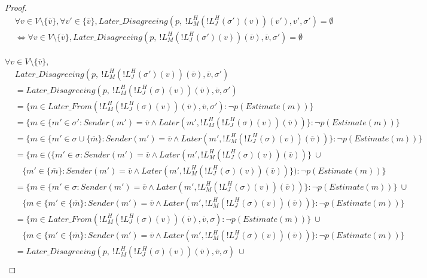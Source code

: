 \begin{proof}
\begin{align}
&\forall v \in V \setminus \{\overline{v}\}, \forall v' \in \{\overline{v}\}, Later\_Disagreeing(p,~!L^H_M(!L^H_J(\sigma')(v))(v'), v', \sigma') = \emptyset \\
&\iff \forall v \in V \setminus \{\overline{v}\}, Later\_Disagreeing(p,~!L^H_M(!L^H_J(\sigma')(v))(\overline{v}), \overline{v}, \sigma') = \emptyset \\
\end{align}

$\forall v \in V \setminus \{\overline{v}\},$
\begin{align}
&Later\_Disagreeing(p,~!L^H_M(!L^H_J(\sigma')(v))(\overline{v}), \overline{v}, \sigma') \\
&= Later\_Disagreeing(p,~!L^H_M(!L^H_J(\sigma)(v))(\overline{v}), \overline{v}, \sigma')\\
&= \{m \in Later\_From(!L^H_M(!L^H_J(\sigma)(v))(\overline{v}), \overline{v}, \sigma') : \neg p(Estimate(m)) \} \\
&= \{m \in \{m' \in \sigma' : Sender(m') = \overline{v} \land Later(m', !L^H_M(!L^H_J(\sigma)(v))(\overline{v}))\} : \neg p(Estimate(m)) \} \\
&= \{m \in \{m' \in \sigma \cup \{\overline{m}\} : Sender(m') = \overline{v} \land Later(m', !L^H_M(!L^H_J(\sigma)(v))(\overline{v}))\} : \neg p(Estimate(m)) \} \\
&= \{m \in \big(\{m' \in \sigma : Sender(m') = \overline{v} \land Later(m', !L^H_M(!L^H_J(\sigma)(v))(\overline{v}))\}~ \cup \\
&~~~~\{m' \in \{\overline{m}\} : Sender(m') = \overline{v} \land Later(m', !L^H_M(!L^H_J(\sigma)(v))(\overline{v}))\}\big) : \neg p(Estimate(m)) \} \\
&= \{m \in \{m' \in \sigma : Sender(m') = \overline{v} \land Later(m', !L^H_M(!L^H_J(\sigma)(v))(\overline{v}))\} : \neg p(Estimate(m)) \} ~ \cup \\
&~~~~\{m \in \{m' \in \{\overline{m}\} : Sender(m') = \overline{v} \land Later(m', !L^H_M(!L^H_J(\sigma)(v))(\overline{v}))\} : \neg p(Estimate(m)) \} \\
&= \{m \in Later\_From(!L^H_M(!L^H_J(\sigma)(v))(\overline{v}), \overline{v}, \sigma) : \neg p(Estimate(m)) \} ~ \cup \\
&~~~~\{m \in \{m' \in \{\overline{m}\} : Sender(m') = \overline{v} \land Later(m', !L^H_M(!L^H_J(\sigma)(v))(\overline{v}))\} : \neg p(Estimate(m)) \} \\
&= Later\_Disagreeing(p,~!L^H_M(!L^H_J(\sigma)(v))(\overline{v}), \overline{v}, \sigma) ~ \cup\\

\end{align}
\end{proof}
